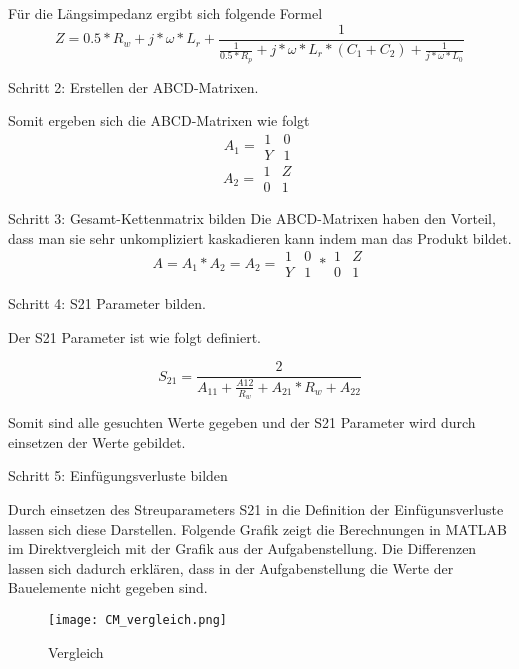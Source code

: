 Für die Längsimpedanz ergibt sich folgende Formel
\begin{equation}
Z = 0.5*R_w+j*\omega*L_r+\frac{ 1 }{ \frac{1}{0.5*R_p}+j*\omega*L_r*(C_1+C_2)+\frac{1}{j*\omega*L_0} }
\end{equation}


Schritt 2: Erstellen der ABCD-Matrixen.

Somit ergeben sich die ABCD-Matrixen wie folgt
\begin{equation}
A_1 =
\begin{matrix}
1 & 0\\ Y&1 
\end{matrix}
\end{equation}
\begin{equation}
A_2 =
\begin{matrix}
1 & Z\\ 0&1 
\end{matrix}
\end{equation}

Schritt 3: Gesamt-Kettenmatrix bilden
Die ABCD-Matrixen haben den Vorteil, dass man sie sehr unkompliziert kaskadieren kann indem man das Produkt bildet.
\begin{equation}
A = A_1*A_2 = A_2 = \begin{matrix}
1 & 0\\ Y&1 
\end{matrix} * 
\begin{matrix}
1 & Z\\ 0&1 
\end{matrix} 
\end{equation}

Schritt 4: S21 Parameter bilden.

Der S21 Parameter ist wie folgt definiert.

\begin{equation}
S_{21} = \frac{2}{A_{11}+\frac{A{12}}{R_w}+A_{21}*R_w+A_{22}}
\end{equation}

Somit sind alle gesuchten Werte gegeben und der S21 Parameter wird durch einsetzen der Werte gebildet.

Schritt 5: Einfügungsverluste bilden

Durch einsetzen des Streuparameters S21 in die Definition der Einfügunsverluste lassen sich diese Darstellen. Folgende Grafik zeigt die Berechnungen in MATLAB im Direktvergleich mit der Grafik aus der Aufgabenstellung. Die Differenzen lassen sich dadurch erklären, dass in der Aufgabenstellung die Werte der Bauelemente nicht gegeben sind.
\begin{figure}[H]
	\centering
	\texttt{[image: CM\_vergleich.png]}
	\caption{Vergleich}
	\label{fig:Vergleich Berechnung Simulation}
\end{figure}
